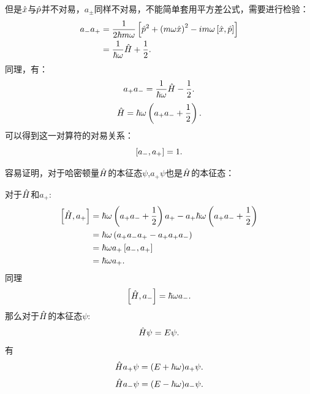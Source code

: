 但是$\hat{x}$与$\hat{p}$并不对易，$a_{\pm}$同样不对易，不能简单套用平方差公式，需要进行检验：
\begin{equation}
    \begin{aligned}
        a_-a_+&=\frac{1}{2\hbar m\omega}\left[\hat{p}^2+\left(m\omega\hat{x}\right)^2-im\omega\left[\hat{x},\hat{p}\right]\right]\\
        &=\frac{1}{\hbar\omega}\hat{H}+\frac{1}{2}.
    \end{aligned}
\end{equation}
同理，有：
\begin{equation}
    a_+a_-=\frac{1}{\hbar\omega}\hat{H}-\frac{1}{2}.
\end{equation}
\begin{equation}
    \hat{H}=\hbar\omega\left(a_+a_-+\frac{1}{2}\right).
\end{equation}
可以得到这一对算符的对易关系：
\begin{equation}
    \left[a_-,a_+\right]=1.
\end{equation}

容易证明，对于哈密顿量$\hat{H}$的本征态$\psi$,$a_+\psi$也是$\hat{H}$的本征态：

\begin{graybox}[Proof]
    对于$\hat{H}$和$a_+$:
    \begin{equation}
        \begin{aligned}
            \left[\hat{H},a_+\right]&=\hbar\omega\left(a_+a_-+\frac{1}{2}\right)a_+-a_+\hbar\omega\left(a_+a_-+\frac{1}{2}\right)\\
            &=\hbar\omega\left(a_+a_-a_+-a_+a_+a_-\right)\\
            &=\hbar\omega a_+\left[a_-,a_+\right]\\
            &=\hbar\omega a_+.
        \end{aligned}
    \end{equation}
    同理
    \begin{equation}
        \left[\hat{H},a_-\right]=\hbar\omega a_-.
    \end{equation}
    那么对于$\hat{H}$的本征态$\psi$:
    \begin{equation}
        \hat{H}\psi=E\psi.
    \end{equation}
    有 
    \begin{equation}
        \hat{H}a_+\psi=(E+\hbar\omega)a_+\psi.
    \end{equation}
    \begin{equation}
        \hat{H}a_-\psi=(E-\hbar\omega)a_-\psi.
    \end{equation}
\end{graybox}

